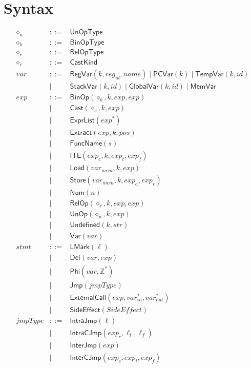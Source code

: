 \documentclass{article}
\begin{document}
\section{Syntax}

\[
\begin{array}{rcl}

\diamond_u & ::= & \mathsf{UnOpType}\\[2mm]
\diamond_b & ::= & \mathsf{BinOpType}\\[2mm]
\diamond_r & ::= & \mathsf{RelOpType}\\[2mm]
\diamond_c & ::= & \mathsf{CastKind}\\[2mm]

var & ::= & \mathsf{RegVar}(k,reg_{id},name)
\mid \mathsf{PCVar}(k)
\mid \mathsf{TempVar}(k,id)\\
& | & \mathsf{StackVar}(k,id)
\mid \mathsf{GlobalVar}(k,id)
\mid \mathsf{MemVar}\\[2mm]

exp & ::= & \mathsf{BinOp}(\diamond_b,k,exp,exp)\\
& | & \mathsf{Cast}(\diamond_c,k,exp)\\
& | & \mathsf{ExprList}(exp^\ast)\\
& | & \mathsf{Extract}(exp,k,pos)\\
& | & \mathsf{FuncName}(s)\\
& | & \mathsf{ITE}(exp_c,k,exp_t,exp_f)\\
& | & \mathsf{Load}(var_{mem},k,exp)\\
& | & \mathsf{Store}(var_{mem},k,exp_a,exp_v)\\
& | & \mathsf{Num}(n)\\
& | & \mathsf{RelOp}(\diamond_r,k,exp,exp)\\
& | & \mathsf{UnOp}(\diamond_u,k,exp)\\
& | & \mathsf{Undefined}(k,str)\\
& | & \mathsf{Var}(var)\\[2mm]

stmt
& ::= & \mathsf{LMark}(\ell)\\
& | & \mathsf{Def}(var,exp)\\
& | & \mathsf{Phi}(var,\mathbb{Z}^{\ast})\\
& | & \mathsf{Jmp}(jmpType)\\
& | & \mathsf{ExternalCall}(exp,var^\ast_{in},var^\ast_{out})\\
& | & \mathsf{SideEffect}(SideEffect)\\[2mm]

jmpType
& ::= & \mathsf{IntraJmp}(\ell)\\
& | & \mathsf{IntraCJmp}(exp_c,\ell_t,\ell_f)\\
& | & \mathsf{InterJmp}(exp)\\
& | & \mathsf{InterCJmp}(exp_c,exp_t,exp_f)

\end{array}
\]
\end{document}
